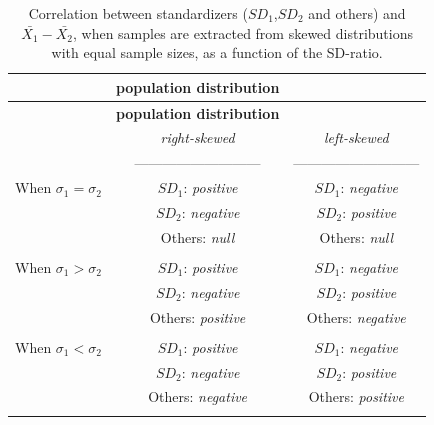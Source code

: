 \documentclass[
  english,
  man]{apa6}
\begin{document}
\begin{longtable}[]{@{}lcc@{}}
\caption{Correlation between standardizers (\(SD_1\),\(SD_2\) and others) and \(\bar{X_1}-\bar{X_2}\), when samples are extracted from skewed distributions with equal sample sizes, as a function of the SD-ratio.}\tabularnewline
\toprule
& \textbf{\textbf{population distribution}} &\tabularnewline
\midrule
\endfirsthead
\toprule
& \textbf{\textbf{population distribution}} &\tabularnewline
\midrule
\endhead
& \emph{right-skewed} & \emph{left-skewed}\tabularnewline
& --------------------------- & ---------------------------\tabularnewline
When \(\sigma_1=\sigma_2\) & \(SD_1\): \emph{positive} & \(SD_1\): \emph{negative}\tabularnewline
& \(SD_2\): \emph{negative} & \(SD_2\): \emph{positive}\tabularnewline
& Others: \emph{null} & Others: \emph{null}\tabularnewline
& &\tabularnewline
When \(\sigma_1>\sigma_2\) & \(SD_1\): \emph{positive} & \(SD_1\): \emph{negative}\tabularnewline
& \(SD_2\): \emph{negative} & \(SD_2\): \emph{positive}\tabularnewline
& Others: \emph{positive} & Others: \emph{negative}\tabularnewline
& &\tabularnewline
When \(\sigma_1<\sigma_2\) & \(SD_1\): \emph{positive} & \(SD_1\): \emph{negative}\tabularnewline
& \(SD_2\): \emph{negative} & \(SD_2\): \emph{positive}\tabularnewline
& Others: \emph{negative} & Others: \emph{positive}\tabularnewline
& &\tabularnewline
\bottomrule
\end{longtable}
\end{document}
